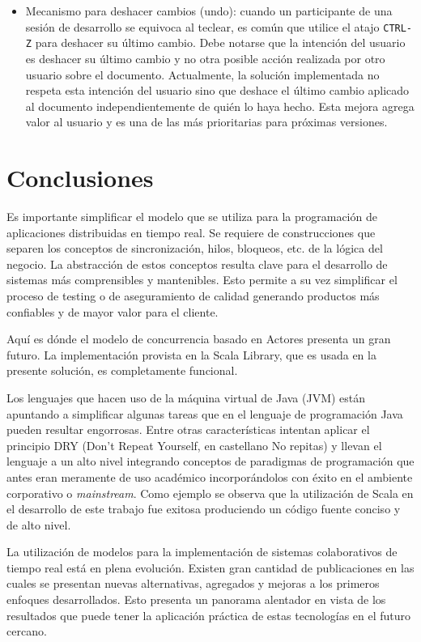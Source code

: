\documentclass[12pt,a4paper]{article}
\let\stdsection\section
\renewcommand\section{\newpage\stdsection}
\begin{document}
\begin{itemize}
	\item Mecanismo para deshacer cambios (undo): cuando un participante de una sesión de desarrollo se equivoca al teclear, es común
		que utilice el atajo \texttt{CTRL-Z} para deshacer su último cambio. Debe notarse que la intención del usuario es deshacer su
		último cambio y no otra posible acción realizada por otro usuario sobre el documento. Actualmente, la solución implementada
		no respeta esta intención del usuario sino que deshace el último cambio aplicado al documento independientemente de
		quién lo haya hecho. Esta mejora agrega valor al usuario y es una de las más prioritarias para próximas versiones.

\end{itemize}

\section{Conclusiones}

Es importante simplificar el modelo que se utiliza para la programación de aplicaciones distribuidas
en tiempo real. Se requiere de construcciones que separen los conceptos de sincronización, hilos, bloqueos, etc.
de la lógica del negocio. La abstracción de estos conceptos resulta clave para el desarrollo de sistemas
más comprensibles y mantenibles. Esto permite a su vez simplificar el proceso de testing o de aseguramiento
de calidad generando productos más confiables y de mayor valor para el cliente.

Aquí es dónde el modelo de concurrencia basado en Actores presenta un gran futuro. La implementación provista en la
Scala Library, que es usada en la presente solución, es completamente funcional.

Los lenguajes que hacen uso de la máquina virtual de Java (JVM) están apuntando a simplificar algunas tareas que en el lenguaje
de programación Java pueden resultar engorrosas. Entre otras características intentan aplicar el principio DRY (Don't Repeat
Yourself, en castellano No repitas) y llevan el lenguaje a un alto nivel integrando conceptos de paradigmas de 
programación que antes eran meramente de uso académico incorporándolos con éxito en el ambiente corporativo o \textit{mainstream}.
Como ejemplo se observa que la utilización de Scala en el desarrollo de este trabajo fue exitosa produciendo un código fuente
conciso y de alto nivel.

La utilización de modelos para la implementación de sistemas colaborativos de tiempo real está en plena evolución.
Existen gran cantidad de publicaciones en las cuales se presentan nuevas alternativas, agregados y mejoras a los
primeros enfoques desarrollados. Esto presenta un panorama alentador en vista de los resultados que puede tener la aplicación práctica
de estas tecnologías en el futuro cercano.
\end{document}
